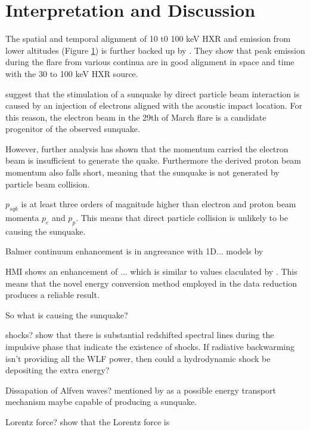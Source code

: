 \section{Interpretation and Discussion}

The spatial and temporal alignment of 10 t0 100 keV HXR and emission from lower altitudes (Figure \ref{}) is further backed up by \cite{}. They show that peak emission during the flare from various continua are in good alignment in space and time with the 30 to 100 keV HXR source.  

\cite{} suggest that the stimulation of a sunquake by direct particle beam interaction is caused by an injection of electrons aligned with the acoustic impact location. For this reason, the electron beam in the 29th of March flare is a candidate progenitor of the observed sunquake. 

However, further analysis has shown that the momentum carried the electron beam is insufficient to generate the quake. Furthermore the derived proton beam momentum also falls short, meaning that the sunquake is not generated by particle beam collision.    



$p_{sqk}$ is at least three orders of magnitude higher than electron and proton beam momenta $p_e$ and $p_p$. This means that direct particle collision is unlikely to be causing the sunquake. 


Balmer continuum enhancement is in angreeance with 1D... models by \cite{}

HMI shows an enhancement of ... which is similar to values claculated by \cite{}. This means that the novel energy conversion method employed in the data reduction produces a reliable result.



So what is causing the sunquake?

shocks? 
\cite{2015ApJ...812...35M} show that there is substantial redshifted spectral lines during the impulsive phase that indicate the existence of shocks. If radiative backwarming isn't providing all the WLF power, then could a hydrodynamic shock be depositing the extra energy?


Dissapation of Alfven waves?
\cite{1982SoPh...80...99E} mentioned by \cite{2015ApJ...812...35M} as a possible energy transport mechanism maybe capable of producing a sunquake.

Lorentz force?
\cite{2014ApJ...796...85J} show that the Lorentz force is  


